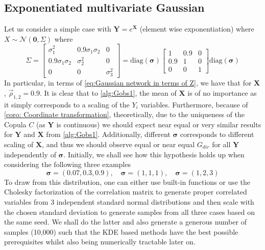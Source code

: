 \documentclass[../Thesis.tex]{subfiles}
\begin{document}
\subsection{Exponentiated multivariate Gaussian}\label{ex:1}
Let us consider a simple case with $\mathbf{Y} = e^{\mathbf{X}}$ (element wise exponentiation) where $X \sim \mathcal{N}\left(\mathbf{0}, \Sigma\right)$ where
$$\Sigma = \begin{bmatrix}
        \sigma_1^2           & 0.9\sigma_1\sigma_2 & 0          \\
        0.9 \sigma_1\sigma_2 & \sigma_2^2          & 0          \\
        0                    & 0                   & \sigma_3^2
    \end{bmatrix} = \text{diag}\left(\boldsymbol \sigma \right) \begin{bmatrix}
        1   & 0.9 & 0 \\
        0.9 & 1   & 0 \\
        0   & 0   & 1
    \end{bmatrix} \text{diag}\left(\boldsymbol \sigma \right)$$
In particular, in terms of \autoref{eq:Gaussian network in terms of Z}, we have that for $\boldsymbol X$, $\vec{\rho}_{1,2} = 0.9$. It is clear that to \autoref{alg:Gobs1}, the mean of $\boldsymbol X$ is of no importance as it simply corresponds to a scaling of the $Y_i$ variables. Furthermore, because of \autoref{coro: Coordinate transformation}, theoretically, due to the uniqueness of the Copula $C$ (as $\boldsymbol Y$ is continuous) we should expect near equal or very similar results for $\boldsymbol Y$ and $\boldsymbol X$ from \autoref{alg:Gobs1}. Additionally, different $\boldsymbol \sigma$ corresponds to different scaling of $\boldsymbol X$, and thus we should observe equal or near equal $G_{dir}$ for all $\boldsymbol Y$ independently of $\boldsymbol \sigma$. Initially, we shall see how this hypothesis holds up when considering the following three examples
$$
    \boldsymbol\sigma = (0.07, 0.3, 0.9), \quad
    \boldsymbol\sigma = (1,1,1), \quad
    \boldsymbol\sigma = (1,2,3)
$$
To draw from this distribution, one can either use built-in functions or use the Cholesky factorization of the correlation matrix to generate proper correlated variables from $3$ independent standard normal distributions and then scale with the chosen standard deviation to generate samples from all three cases based on the same seed. We shall do the latter and also generate a generous number of samples (10,000) such that the KDE based methods have the best possible prerequisites whilst also being numerically tractable later on.
\end{document}
